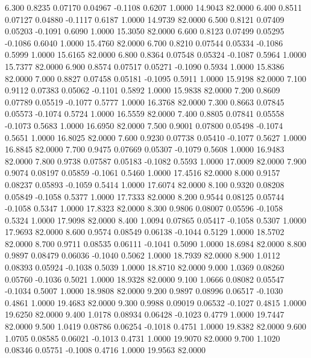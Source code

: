   6.300   0.8235   0.07170   0.04967  -0.1108   0.6207   1.0000  14.9043  82.0000
   6.400   0.8511   0.07127   0.04880  -0.1117   0.6187   1.0000  14.9739  82.0000
   6.500   0.8121   0.07409   0.05203  -0.1091   0.6090   1.0000  15.3050  82.0000
   6.600   0.8123   0.07499   0.05295  -0.1086   0.6040   1.0000  15.4760  82.0000
   6.700   0.8210   0.07544   0.05334  -0.1086   0.5999   1.0000  15.6165  82.0000
   6.800   0.8364   0.07548   0.05324  -0.1087   0.5964   1.0000  15.7377  82.0000
   6.900   0.8574   0.07517   0.05271  -0.1090   0.5934   1.0000  15.8386  82.0000
   7.000   0.8827   0.07458   0.05181  -0.1095   0.5911   1.0000  15.9198  82.0000
   7.100   0.9112   0.07383   0.05062  -0.1101   0.5892   1.0000  15.9838  82.0000
   7.200   0.8609   0.07789   0.05519  -0.1077   0.5777   1.0000  16.3768  82.0000
   7.300   0.8663   0.07845   0.05573  -0.1074   0.5724   1.0000  16.5559  82.0000
   7.400   0.8805   0.07841   0.05558  -0.1073   0.5683   1.0000  16.6950  82.0000
   7.500   0.9001   0.07800   0.05498  -0.1074   0.5651   1.0000  16.8025  82.0000
   7.600   0.9230   0.07738   0.05410  -0.1077   0.5627   1.0000  16.8845  82.0000
   7.700   0.9475   0.07669   0.05307  -0.1079   0.5608   1.0000  16.9483  82.0000
   7.800   0.9738   0.07587   0.05183  -0.1082   0.5593   1.0000  17.0009  82.0000
   7.900   0.9074   0.08197   0.05859  -0.1061   0.5460   1.0000  17.4516  82.0000
   8.000   0.9157   0.08237   0.05893  -0.1059   0.5414   1.0000  17.6074  82.0000
   8.100   0.9320   0.08208   0.05849  -0.1058   0.5377   1.0000  17.7333  82.0000
   8.200   0.9544   0.08125   0.05744  -0.1058   0.5347   1.0000  17.8323  82.0000
   8.300   0.9806   0.08007   0.05596  -0.1058   0.5324   1.0000  17.9098  82.0000
   8.400   1.0094   0.07865   0.05417  -0.1058   0.5307   1.0000  17.9693  82.0000
   8.600   0.9574   0.08549   0.06138  -0.1044   0.5129   1.0000  18.5702  82.0000
   8.700   0.9711   0.08535   0.06111  -0.1041   0.5090   1.0000  18.6984  82.0000
   8.800   0.9897   0.08479   0.06036  -0.1040   0.5062   1.0000  18.7939  82.0000
   8.900   1.0112   0.08393   0.05924  -0.1038   0.5039   1.0000  18.8710  82.0000
   9.000   1.0369   0.08260   0.05760  -0.1036   0.5021   1.0000  18.9328  82.0000
   9.100   1.0666   0.08082   0.05547  -0.1034   0.5007   1.0000  18.9808  82.0000
   9.200   0.9897   0.08996   0.06517  -0.1030   0.4861   1.0000  19.4683  82.0000
   9.300   0.9988   0.09019   0.06532  -0.1027   0.4815   1.0000  19.6250  82.0000
   9.400   1.0178   0.08934   0.06428  -0.1023   0.4779   1.0000  19.7447  82.0000
   9.500   1.0419   0.08786   0.06254  -0.1018   0.4751   1.0000  19.8382  82.0000
   9.600   1.0705   0.08585   0.06021  -0.1013   0.4731   1.0000  19.9070  82.0000
   9.700   1.1020   0.08346   0.05751  -0.1008   0.4716   1.0000  19.9563  82.0000
